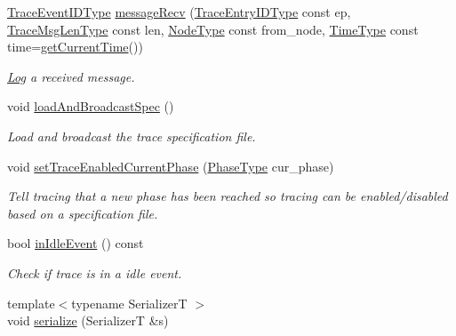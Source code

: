 \begin{DoxyCompactItemize}
\hyperlink{namespacevt_1_1trace_a64a7185f3e102df8d8258f263ccd1582}{Trace\+Event\+I\+D\+Type} \hyperlink{structvt_1_1trace_1_1_trace_a73c5b4c3f87e7447ee91077c21de1038}{message\+Recv} (\hyperlink{namespacevt_1_1trace_a3c14050715ba9eceaeff51fb3de64f2f}{Trace\+Entry\+I\+D\+Type} const ep, \hyperlink{namespacevt_1_1trace_aeb598f45d67d41db7902e494f2f0ce59}{Trace\+Msg\+Len\+Type} const len, \hyperlink{namespacevt_a866da9d0efc19c0a1ce79e9e492f47e2}{Node\+Type} const from\+\_\+node, \hyperlink{namespacevt_a2b9f28078dc309ad0706b69ded743e69}{Time\+Type} const time=\hyperlink{structvt_1_1trace_1_1_trace_lite_a5ddfc40d8206946d33630d4b81b6126c}{get\+Current\+Time}())
\begin{DoxyCompactList}\small\item\em \hyperlink{structvt_1_1trace_1_1_log}{Log} a received message. \end{DoxyCompactList}\item 
void \hyperlink{structvt_1_1trace_1_1_trace_a06f74f8d2c0c2fb97be14a264fd36a45}{load\+And\+Broadcast\+Spec} ()
\begin{DoxyCompactList}\small\item\em Load and broadcast the trace specification file. \end{DoxyCompactList}\item 
void \hyperlink{structvt_1_1trace_1_1_trace_aa2740411eec8e1dabf10d60f48193e69}{set\+Trace\+Enabled\+Current\+Phase} (\hyperlink{namespacevt_a46ce6733d5cdbd735d561b7b4029f6d7}{Phase\+Type} cur\+\_\+phase)
\begin{DoxyCompactList}\small\item\em Tell tracing that a new phase has been reached so tracing can be enabled/disabled based on a specification file. \end{DoxyCompactList}\item 
bool \hyperlink{structvt_1_1trace_1_1_trace_a1e7429d95dbddd9f235a02800d158d36}{in\+Idle\+Event} () const
\begin{DoxyCompactList}\small\item\em Check if trace is in a idle event. \end{DoxyCompactList}\item 
{\footnotesize template$<$typename SerializerT $>$ }\\void \hyperlink{structvt_1_1trace_1_1_trace_a737d62cb21f0b634ca5a45e0221f7ee9}{serialize} (SerializerT \&s)
\end{DoxyCompactItemize}
